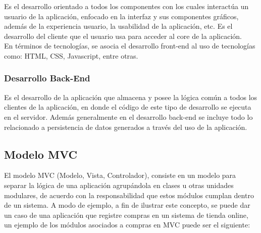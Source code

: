 Es el desarrollo orientado a todos los componentes con los cuales interactúa un usuario de la aplicación, enfocado en la interfaz y sus componentes gráficos, además de la experiencia usuario, la usabilidad de la aplicación, etc. Es el desarrollo del cliente que el usuario usa para acceder al core de la aplicación.\\

En términos de tecnologías, se asocia el desarrollo front-end al uso de tecnologías como: HTML, CSS, Javascript, entre otras.

\subsubsection{Desarrollo Back-End} %
\label{ssub:desarrollo_back_end}


Es el desarrollo de la aplicación que almacena y posee la lógica común a todos los clientes de la aplicación, en donde el código de este tipo de desarrollo se ejecuta en el servidor. Además generalmente en el desarrollo back-end se incluye todo lo relacionado a persistencia de datos generados a través del uso de la aplicación.


\subsection{Modelo MVC} %
\label{sub:modelo_mvc}
El modelo MVC (Modelo, Vista, Controlador)\cite{mvc}, consiste en un modelo para separar la lógica de una aplicación agrupándola en clases u otras unidades modulares, de acuerdo con la responsabilidad que estos módulos cumplan dentro de un sistema. A modo de ejemplo, a fin de ilustrar este concepto, se puede dar un caso de una aplicación que registre compras en un sistema de tienda online, un ejemplo de los módulos asociados a compras en MVC puede ser el siguiente:

